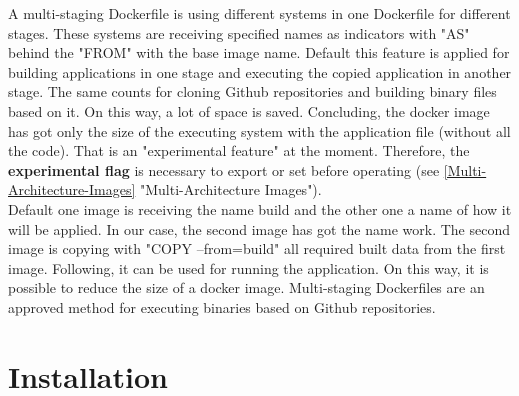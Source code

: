 A multi-staging Dockerfile is using different systems in one Dockerfile for different stages. These systems are receiving specified names as indicators with "AS" behind the "FROM" with the base image name. 
Default this feature is applied for building applications in one stage and executing the copied application in another stage. The same counts for cloning Github repositories and building binary files based on it. On this way, a lot of space is saved.
Concluding, the docker image has got only the size of the executing system with the application file (without all the code). 
That is an "experimental feature"  at the moment. Therefore, the \textbf{experimental flag} is necessary to export or set before operating (see \ref{Multi-Architecture-Images} "Multi-Architecture Images"). \\
Default one image is receiving the name build and the other one a name of how it will be applied. In our case, the second image has got the name work. 
The second image is copying with "COPY --from=build" all required built data from the first image. Following, it can be used for running the application. 
On this way, it is possible to reduce the size of a docker image. 
Multi-staging Dockerfiles are an approved method for executing binaries based on Github repositories.


\section{Installation}

